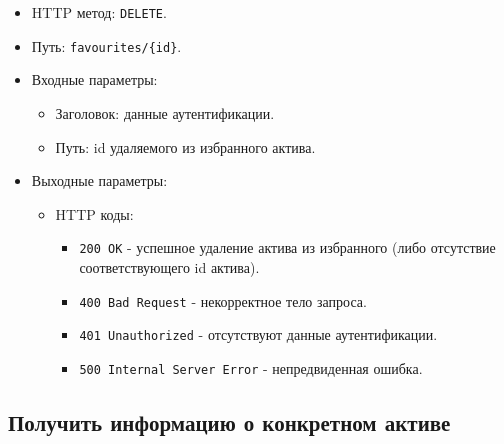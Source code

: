 \documentclass[a4paper, 14pt]{article}
\begin{document}
\begin{itemize}
    \item HTTP метод: \texttt{DELETE}.
    \item Путь: \texttt{favourites/\{id\}}.
    \item Входные параметры:
    \begin{itemize}
        \item Заголовок: данные аутентификации.
        \item Путь: id удаляемого из избранного актива.
    \end{itemize}
    \item Выходные параметры:
    \begin{itemize}
        \item HTTP коды:
        \begin{itemize}
            \item \texttt{200 OK} - успешное удаление актива из избранного (либо отсутствие соответствующего id актива).
            \item \texttt{400 Bad Request} - некорректное тело запроса.
            \item \texttt{401 Unauthorized} - отсутствуют данные аутентификации.
            \item \texttt{500 Internal Server Error} - непредвиденная ошибка.
        \end{itemize}
    \end{itemize}
\end{itemize}

\subsection{Получить информацию о конкретном активе}
\end{document}
